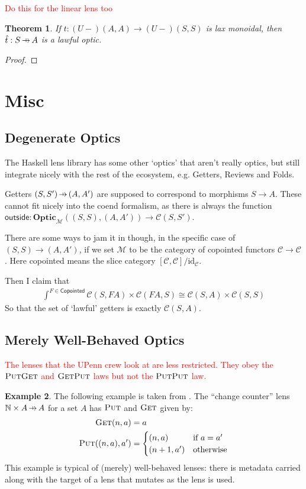 \documentclass[11pt,a4paper]{article}
\theoremstyle{plain}
\newtheorem{theorem}{Theorem}[subsection]
\theoremstyle{definition}
\newtheorem{example}[theorem]{Example}
\newcommand{\C}{\mathscr{C}}
\newcommand{\M}{\mathscr{M}}
\newcommand{\bN}{\mathbb{N}}
\newcommand{\Optic}{\mathbf{Optic}}
\newcommand{\id}{\mathrm{id}}
\newcommand{\fget}{\textsc{Get}}
\newcommand{\fput}{\textsc{Put}}
\newcommand{\outside}{\mathsf{outside}}
\newcommand{\hto}{\ensuremath{\,\mathaccent\shortmid\rightarrow\,}}
\newcommand{\todo}[1]{\textcolor{red}{\small #1}}
\begin{document}
\todo{Do this for the linear lens too}
\begin{theorem}
If $t : (U-)(A,A) \to (U-)(S,S)$ is lax monoidal, then $\hat{t} : S \hto A$ is a lawful optic.
\end{theorem}
\begin{proof}

\end{proof}



\section{Misc}
\subsection{Degenerate Optics}
The Haskell lens library has some other `optics' that aren't really optics, but still integrate nicely with the rest of the ecosystem, e.g. Getters, Reviews and Folds. 

Getters $(S, S') \hto (A, A')$ are supposed to correspond to morphisms $S \to A$. These cannot fit nicely into the coend formalism, as there is always the function $\outside : \Optic_\M((S, S), (A, A')) \to \C(S, S')$.

There are some ways to jam it in though, in the specific case of $(S, S) \to (A, A')$, if we set $\M$ to be the category of copointed functors $\C \to \C$. Here copointed means the slice category $[\C, \C] / \id_\C$. 

Then I claim that 
\begin{align*}
\int^{F \in \mathsf{Copointed}} \C(S, FA) \times \C(FA, S) \cong \C(S, A) \times \C(S, S)
\end{align*}
So that the set of `lawful' getters is exactly $\C(S, A)$.



\subsection{Merely Well-Behaved Optics}
\todo{
The lenses that the UPenn crew look at are less restricted. They obey the $\fput\fget$ and $\fget\fput$ laws but not the $\fput\fput$ law. 
}

\begin{example}
The following example is taken from \cite{AClearPictureOfLensLaws}. The ``change counter'' lens $\bN \times A \hto A$ for a set $A$ has $\fput$ and $\fget$ given by:
\begin{align*}
\fget(n, a) &= a \\
\fput((n, a), a') &= \begin{cases}
(n, a) & \text{if } a = a' \\
(n+1, a') & \text{otherwise}
\end{cases}
\end{align*}
This example is typical of (merely) well-behaved lenses: there is metadata carried along with the target of a lens that mutates as the lens is used.
\end{example}
\end{document}
